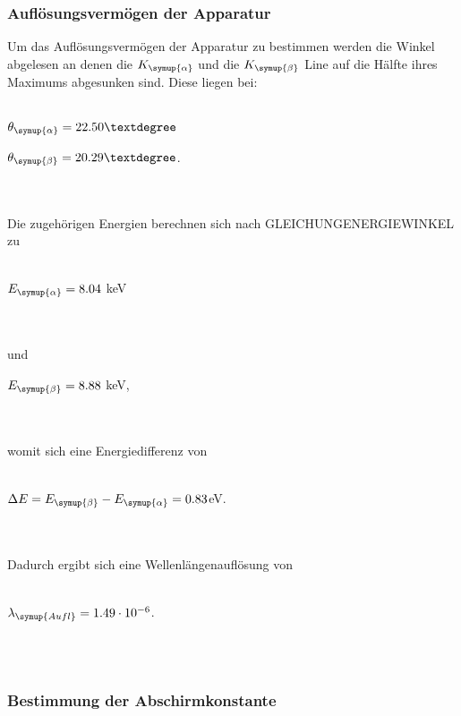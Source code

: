     \subsubsection{Auflösungsvermögen der Apparatur} 
        Um das Auflösungsvermögen der Apparatur zu bestimmen werden die Winkel abgelesen an denen die $K_{\symup{\alpha}}$ und die $K_{\symup{\beta}}$
        Line auf die Hälfte ihres Maximums abgesunken sind.
        Diese liegen bei:
        \\ \\
        \centerline{$\theta_{\symup{\alpha}} = 22.50°$}
        \centerline{$\theta_{\symup{\beta}} = 20.29°$.}
        \\ \\
        Die zugehörigen Energien berechnen sich nach GLEICHUNGENERGIEWINKEL zu
        \\ \\
        \centerline{$E_{\symup{\alpha}} = 8.04$ keV}
        \\ \\
        und 
        \centerline{$E_{\symup{\beta}} = 8.88$ keV,}
        \\ \\
        womit sich eine Energiedifferenz von 
        \\ \\
        \centerline{$\Delta E = E_{\symup{\beta}} - E_{\symup{\alpha}} = 0.83$eV.}
        \\ \\
        Dadurch ergibt sich eine Wellenlängenauflösung von 
        \\ \\
        \centerline{$\lambda_{\symup{Aufl}} = 1.49 \cdot 10^{-6}$.}
        \\ \\
    \subsubsection{Bestimmung der Abschirmkonstante}
